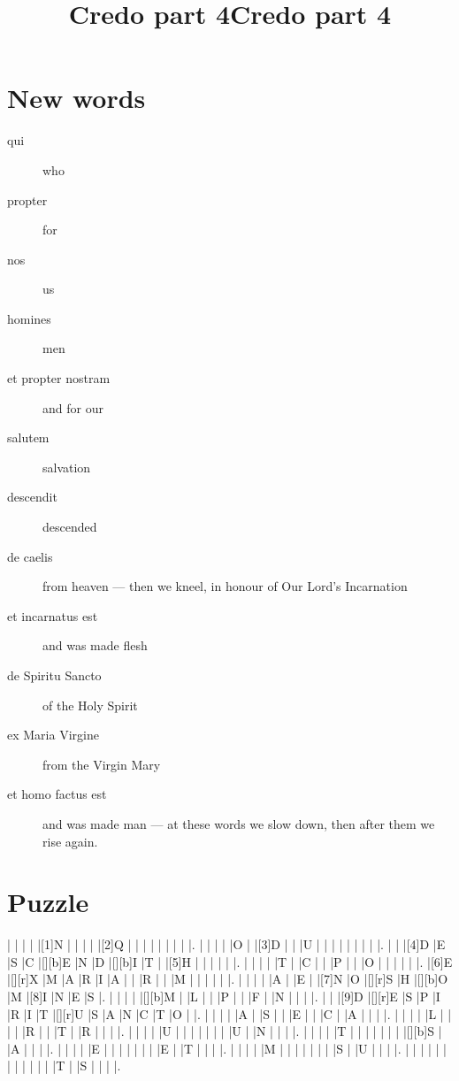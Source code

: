 \documentclass[12pt,a4paper]{article}
\title{Credo part 4}
\begin{document}
\title{Credo part 4}

\maketitle

\section{New words}


\begin{description}
\item[qui] who
\item[propter] for
\item[nos] us
\item[homines] men
\item[et propter nostram] and for our
\item[salutem] salvation
\item[descendit] descended
\item[de caelis] from heaven --- then we kneel, in honour of Our Lord's Incarnation
\item[et incarnatus est] and was made flesh
\item[de Spiritu Sancto] of the Holy Spirit
\item[ex Maria Virgine] from the Virgin Mary
\item[et homo factus est] and was made man --- at these words we slow down, then after them we rise again.
\end{description}

\newpage

\section{Puzzle}

\begin{Puzzle}{18}{15}
|{} |{} |{} |{} |[1]N |{} |{} |{} |{} |[2]Q |{} |{} |{} |{} |{} |{} |{} |{} |.
|{} |{} |{} |{} |O |{} |[3]D |{} |{} |U |{} |{} |{} |{} |{} |{} |{} |{} |.
|{} |{} |[4]D |E |S |C |[][b]E |N |D |[][b]I |T |{} |[5]H |{} |{} |{} |{} |{} |.
|{} |{} |{} |{} |T |{} |C |{} |{} |P |{} |{} |O |{} |{} |{} |{} |{} |.
|[6]E |[][r]X |M |A |R |I |A |{} |{} |R |{} |{} |M |{} |{} |{} |{} |{} |.
|{} |{} |{} |{} |A |{} |E |{} |[7]N |O |[][r]S |H |[][b]O |M |[8]I |N |E |S |.
|{} |{} |{} |{} |[][b]M |{} |L |{} |{} |P |{} |{} |F |{} |N |{} |{} |{} |.
|{} |{} |[9]D |[][r]E |S |P |I |R |I |T |[][r]U |S |A |N |C |T |O |{} |.
|{} |{} |{} |{} |A |{} |S |{} |{} |E |{} |{} |C |{} |A |{} |{} |{} |.
|{} |{} |{} |{} |L |{} |{} |{} |{} |R |{} |{} |T |{} |R |{} |{} |{} |.
|{} |{} |{} |{} |U |{} |{} |{} |{} |{} |{} |{} |U |{} |N |{} |{} |{} |.
|{} |{} |{} |{} |T |{} |{} |{} |{} |{} |{} |{} |[][b]S |{} |A |{} |{} |{} |.
|{} |{} |{} |{} |E |{} |{} |{} |{} |{} |{} |{} |E |{} |T |{} |{} |{} |.
|{} |{} |{} |{} |M |{} |{} |{} |{} |{} |{} |{} |S |{} |U |{} |{} |{} |.
|{} |{} |{} |{} |{} |{} |{} |{} |{} |{} |{} |{} |T |{} |S |{} |{} |{} |.
\end{Puzzle}
\end{document}
